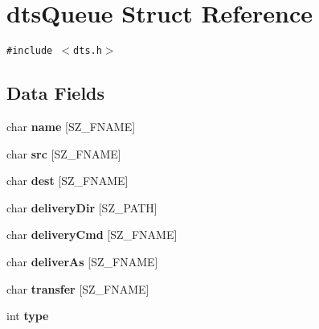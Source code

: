 \hypertarget{structdtsQueue}{
\section{dtsQueue Struct Reference}
\label{structdtsQueue}
}
{\tt \#include $<$dts.h$>$}

\subsection*{Data Fields}
\begin{CompactItemize}
\item 
\hypertarget{structdtsQueue_642129a5a6265086661ca57c30ef6d6a}{
char \textbf{name} \mbox{[}SZ\_\-FNAME\mbox{]}}
\label{structdtsQueue_642129a5a6265086661ca57c30ef6d6a}

\item 
\hypertarget{structdtsQueue_8d308868a1ffdef00e5e9e9dd362c71e}{
char \textbf{src} \mbox{[}SZ\_\-FNAME\mbox{]}}
\label{structdtsQueue_8d308868a1ffdef00e5e9e9dd362c71e}

\item 
\hypertarget{structdtsQueue_4aae983826f5fc858ac52146366bc9fc}{
char \textbf{dest} \mbox{[}SZ\_\-FNAME\mbox{]}}
\label{structdtsQueue_4aae983826f5fc858ac52146366bc9fc}

\item 
\hypertarget{structdtsQueue_4fd0dd11e8bf7545bc8e77e011a78ead}{
char \textbf{deliveryDir} \mbox{[}SZ\_\-PATH\mbox{]}}
\label{structdtsQueue_4fd0dd11e8bf7545bc8e77e011a78ead}

\item 
\hypertarget{structdtsQueue_cc74c908d85563291a0d5983da48fa7b}{
char \textbf{deliveryCmd} \mbox{[}SZ\_\-FNAME\mbox{]}}
\label{structdtsQueue_cc74c908d85563291a0d5983da48fa7b}

\item 
\hypertarget{structdtsQueue_dbf9c17dcbae62819a2c9ee137383a92}{
char \textbf{deliverAs} \mbox{[}SZ\_\-FNAME\mbox{]}}
\label{structdtsQueue_dbf9c17dcbae62819a2c9ee137383a92}

\item 
\hypertarget{structdtsQueue_3b879f771299d4c1cd10e1ee80e43830}{
char \textbf{transfer} \mbox{[}SZ\_\-FNAME\mbox{]}}
\label{structdtsQueue_3b879f771299d4c1cd10e1ee80e43830}

\item 
\hypertarget{structdtsQueue_198e9869b8a1c32572e43458fe99bd11}{
int \textbf{type}}
\label{structdtsQueue_198e9869b8a1c32572e43458fe99bd11}


\end{CompactItemize}

